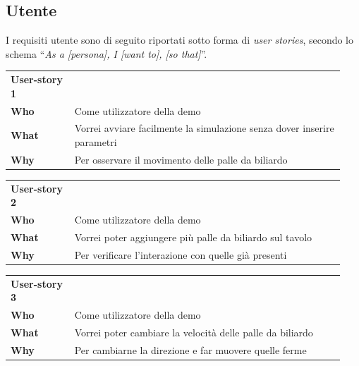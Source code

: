 \subsection{Utente}\label{subsec:demo-utente}
I requisiti utente sono di seguito riportati sotto forma di \textit{user stories}, secondo lo schema
``\textit{As a [persona], I [want to], [so that]}''.
\begin{table}[H]
    \begin{tabular}{p{0.18\linewidth}p{0.76\linewidth}}
        \toprule
        \textbf{User-story 1} &                                                                                      \\
        \textbf{Who}          & Come utilizzatore della demo                                                         \\
        \textbf{What}         & Vorrei avviare facilmente la simulazione senza dover inserire parametri              \\
        \textbf{Why}          & Per osservare il movimento delle palle da biliardo \\
        \bottomrule
    \end{tabular}\label{tab:user-story-1}
\end{table}
\begin{table}[H]
    \begin{tabular}{p{0.18\linewidth}p{0.76\linewidth}}
        \toprule
        \textbf{User-story 2} &                                                                               \\
        \textbf{Who}          & Come utilizzatore della demo                                                  \\
        \textbf{What}         & Vorrei poter aggiungere più palle da biliardo sul tavolo                      \\
        \textbf{Why}          & Per verificare l'interazione con quelle già presenti  \\
        \bottomrule
    \end{tabular}\label{tab:user-story-2}
\end{table}
\begin{table}[H]
    \begin{tabular}{p{0.18\linewidth}p{0.76\linewidth}}
        \toprule
        \textbf{User-story 3} &                                                           \\
        \textbf{Who}          & Come utilizzatore della demo                              \\
        \textbf{What}         & Vorrei poter cambiare la velocità delle palle da biliardo \\
        \textbf{Why}          & Per cambiarne la direzione e far muovere quelle ferme   \\
        \bottomrule
    \end{tabular}\label{tab:user-story-3}
\end{table}
